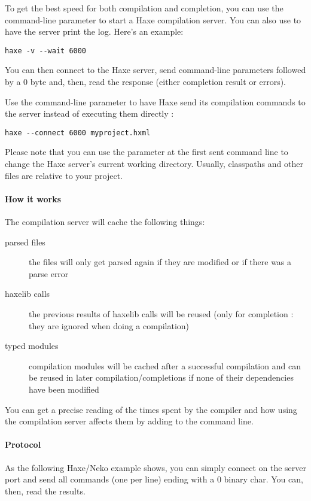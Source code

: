 To get the best speed for both compilation and completion, you can use the  command-line parameter to start a Haxe compilation server. You can also use  to have the server print the log. Here's an example:

\begin{lstlisting}
haxe -v --wait 6000
\end{lstlisting}

You can then connect to the Haxe server, send command-line parameters followed by a 0 byte and, then, read the response (either completion result or errors).

Use the  command-line parameter to have Haxe send its compilation commands to the server instead of executing them directly :

\begin{lstlisting}
haxe --connect 6000 myproject.hxml
\end{lstlisting}

Please note that you can use the parameter  at the first sent command line to change the Haxe server's current working directory. Usually, classpaths and other files are relative to your project.

\paragraph{How it works}
The compilation server will cache the following things:

\begin{description}
	\item[parsed files] the files will only get parsed again if they are modified or if there was a parse error
	\item[haxelib calls] the previous results of haxelib calls will be reused (only for completion : they are ignored when doing a compilation)
	\item[typed modules] compilation modules will be cached after a successful compilation and can be reused in later compilation/completions if none of their dependencies have been modified
\end{description}

You can get a precise reading of the times spent by the compiler and how using the compilation server affects them by adding  to the command line.

\paragraph{Protocol}
As the following Haxe/Neko example shows, you can simply connect on the server port and send all commands (one per line) ending with a 0 binary char. You can, then, read the results.

